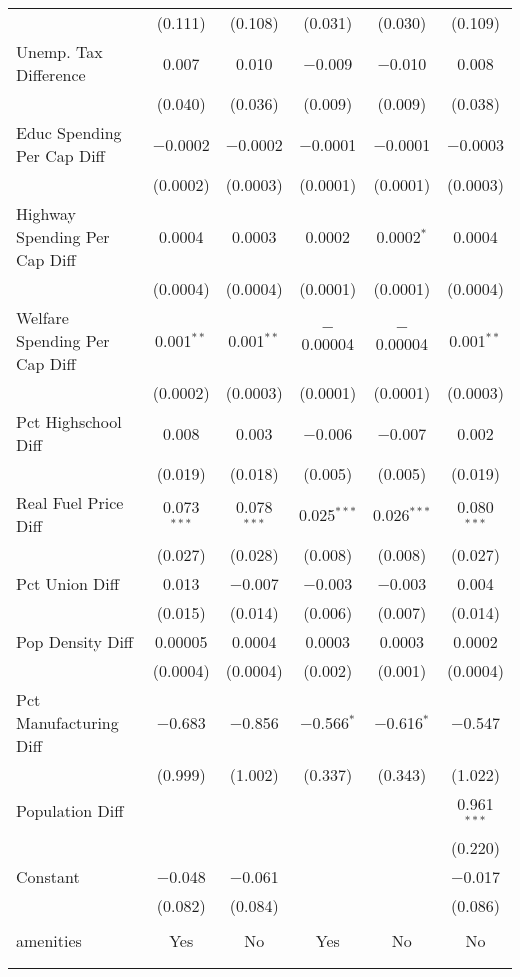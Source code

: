 \begin{table}[!htbp]
\begin{tabular}{@{\extracolsep{5pt}}lccccc}
  & (0.111) & (0.108) & (0.031) & (0.030) & (0.109) \\ 
  Unemp. Tax Difference & 0.007 & 0.010 & $-$0.009 & $-$0.010 & 0.008 \\ 
  & (0.040) & (0.036) & (0.009) & (0.009) & (0.038) \\ 
  Educ Spending Per Cap Diff & $-$0.0002 & $-$0.0002 & $-$0.0001 & $-$0.0001 & $-$0.0003 \\ 
  & (0.0002) & (0.0003) & (0.0001) & (0.0001) & (0.0003) \\ 
  Highway Spending Per Cap Diff & 0.0004 & 0.0003 & 0.0002 & 0.0002$^{*}$ & 0.0004 \\ 
  & (0.0004) & (0.0004) & (0.0001) & (0.0001) & (0.0004) \\ 
  Welfare Spending Per Cap Diff & 0.001$^{**}$ & 0.001$^{**}$ & $-$0.00004 & $-$0.00004 & 0.001$^{**}$ \\ 
  & (0.0002) & (0.0003) & (0.0001) & (0.0001) & (0.0003) \\ 
  Pct Highschool Diff & 0.008 & 0.003 & $-$0.006 & $-$0.007 & 0.002 \\ 
  & (0.019) & (0.018) & (0.005) & (0.005) & (0.019) \\ 
  Real Fuel Price Diff & 0.073$^{***}$ & 0.078$^{***}$ & 0.025$^{***}$ & 0.026$^{***}$ & 0.080$^{***}$ \\ 
  & (0.027) & (0.028) & (0.008) & (0.008) & (0.027) \\ 
  Pct Union Diff & 0.013 & $-$0.007 & $-$0.003 & $-$0.003 & 0.004 \\ 
  & (0.015) & (0.014) & (0.006) & (0.007) & (0.014) \\ 
  Pop Density Diff & 0.00005 & 0.0004 & 0.0003 & 0.0003 & 0.0002 \\ 
  & (0.0004) & (0.0004) & (0.002) & (0.001) & (0.0004) \\ 
  Pct Manufacturing Diff & $-$0.683 & $-$0.856 & $-$0.566$^{*}$ & $-$0.616$^{*}$ & $-$0.547 \\ 
  & (0.999) & (1.002) & (0.337) & (0.343) & (1.022) \\ 
  Population Diff &  &  &  &  & 0.961$^{***}$ \\ 
  &  &  &  &  & (0.220) \\ 
  Constant & $-$0.048 & $-$0.061 &  &  & $-$0.017 \\ 
  & (0.082) & (0.084) &  &  & (0.086) \\ 
 \hline \\[-1.8ex] 
amenities & Yes & No & Yes & No & No \\ 
\hline \\[-1.8ex] 
\hline 
\hline \\[-1.8ex] 
\end{tabular} 
\end{table} 
